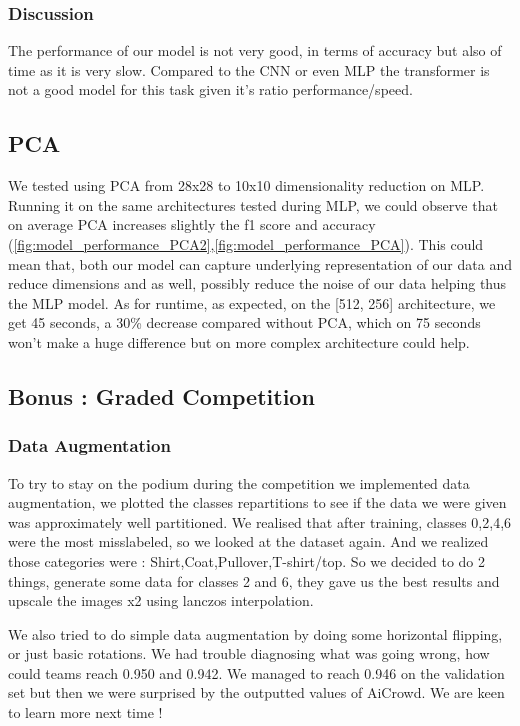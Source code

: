 \subsubsection{Discussion}
The performance of our model is not very good, in terms of accuracy but also of time as it is very slow. Compared to the CNN or even MLP the transformer is not a good model for this task given it's ratio performance/speed. 

\subsection{PCA}
We tested using PCA from 28x28 to 10x10 dimensionality reduction on MLP. Running it on the same architectures tested during MLP, we could observe that on average PCA increases slightly the f1 score and accuracy (\cref{fig:model_performance_PCA2},\cref{fig:model_performance_PCA}). This could mean that, both our model can capture underlying representation of our data and reduce dimensions and as well, possibly reduce the noise of our data helping thus the MLP model. As for runtime, as expected, on the [512, 256] architecture, we get 45 seconds, a 30\% decrease compared without PCA, which on 75 seconds won't make a huge difference but on more complex architecture could help. 



\subsection{Bonus : Graded Competition}
\subsubsection{Data Augmentation}
To try to stay on the podium during the competition we implemented data augmentation, we plotted the classes repartitions to see if the data we were given was approximately well partitioned. 
We realised that after training, classes 0,2,4,6 were the most misslabeled, so we looked at the dataset again. 
And we realized those categories were : Shirt,Coat,Pullover,T-shirt/top. 
So we decided to do 2 things, generate some data for classes 2 and 6, they gave us the best results and upscale the images x2 using lanczos interpolation.

We also tried to do simple data augmentation by doing some horizontal flipping, or just basic rotations. We had trouble diagnosing what was going wrong, how could teams reach 0.950 and 0.942. We managed to reach 0.946 on the validation set but then we were surprised by the outputted values of AiCrowd. We are keen to learn more next time ! 


